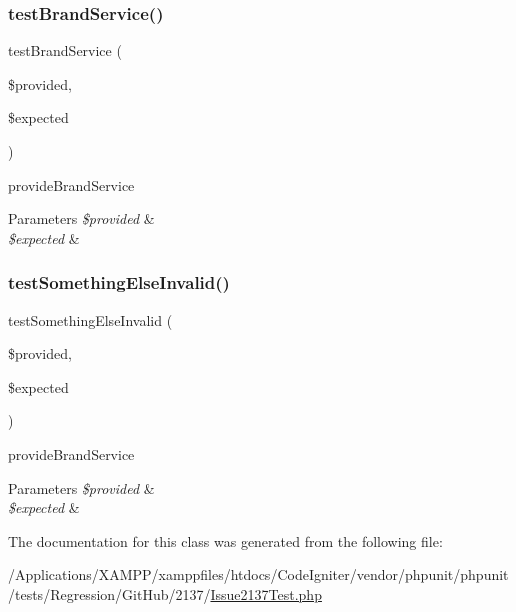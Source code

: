 \mbox{\label{class_issue2137_test_a870c9c70770a462137e46965bab7e285}} 
\subsubsection{\texorpdfstring{test\+Brand\+Service()}{testBrandService()}}
{\footnotesize\ttfamily test\+Brand\+Service (\begin{DoxyParamCaption}\item[{}]{\$provided,  }\item[{}]{\$expected }\end{DoxyParamCaption})}

provide\+Brand\+Service 
\begin{DoxyParams}{Parameters}
{\em \$provided} & \\
\hline
{\em \$expected} & \\
\hline
\end{DoxyParams}
\mbox{\label{class_issue2137_test_ae7e2a2aeeaf5a4e9a06ceb5a895befc7}} 
\subsubsection{\texorpdfstring{test\+Something\+Else\+Invalid()}{testSomethingElseInvalid()}}
{\footnotesize\ttfamily test\+Something\+Else\+Invalid (\begin{DoxyParamCaption}\item[{}]{\$provided,  }\item[{}]{\$expected }\end{DoxyParamCaption})}

provide\+Brand\+Service 
\begin{DoxyParams}{Parameters}
{\em \$provided} & \\
\hline
{\em \$expected} & \\
\hline
\end{DoxyParams}


The documentation for this class was generated from the following file\+:\begin{DoxyCompactItemize}
\item 
/\+Applications/\+X\+A\+M\+P\+P/xamppfiles/htdocs/\+Code\+Igniter/vendor/phpunit/phpunit/tests/\+Regression/\+Git\+Hub/2137/\mbox{\hyperlink{_issue2137_test_8php}{Issue2137\+Test.\+php}}\end{DoxyCompactItemize}
